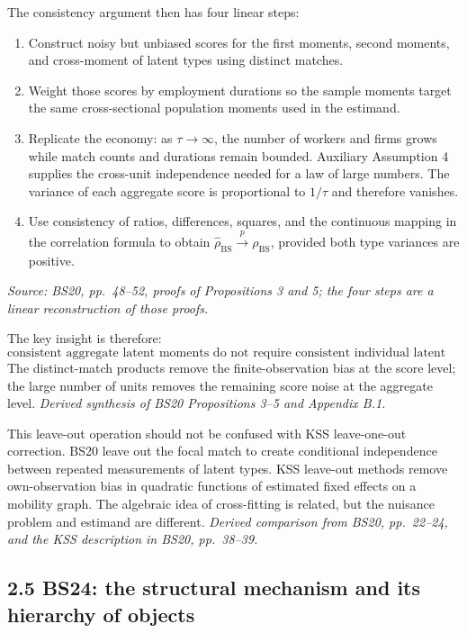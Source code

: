 \documentclass[11pt]{article}
\begin{document}
The consistency argument then has four linear steps:

\begin{enumerate}
\item Construct noisy but unbiased scores for the first moments, second
  moments, and cross-moment of latent types using distinct matches.
\item Weight those scores by employment durations so the sample moments target
  the same cross-sectional population moments used in the estimand.
\item Replicate the economy: as \(\tau\to\infty\), the number of workers and
  firms grows while match counts and durations remain bounded.  Auxiliary
  Assumption 4 supplies the cross-unit independence needed for a law of large
  numbers.  The variance of each aggregate score is proportional to
  \(1/\tau\) and therefore vanishes.
\item Use consistency of ratios, differences, squares, and the continuous
  mapping in the correlation formula to obtain
  \(\widehat\rho_{\mathrm{BS}}\overset{p}{\to}\rho_{\mathrm{BS}}\), provided
  both type variances are positive.
\end{enumerate}

\textit{Source: BS20, pp.\ 48--52, proofs of Propositions 3 and 5; the four
steps are a linear reconstruction of those proofs.}

The key insight is therefore:
\[
\boxed{
\text{consistent aggregate latent moments do not require consistent
individual latent types.}
}
\tag{T2.6}
\]
The distinct-match products remove the finite-observation bias at the score
level; the large number of units removes the remaining score noise at the
aggregate level.  \textit{Derived synthesis of BS20 Propositions 3--5 and
Appendix B.1.}

This leave-out operation should not be confused with KSS leave-one-out
correction.  BS20 leave out the focal match to create conditional independence
between repeated measurements of latent types.  KSS leave-out methods remove
own-observation bias in quadratic functions of estimated fixed effects on a
mobility graph.  The algebraic idea of cross-fitting is related, but the
nuisance problem and estimand are different.
\textit{Derived comparison from BS20, pp.\ 22--24, and the KSS description in
BS20, pp.\ 38--39.}

\subsection{2.5 BS24: the structural mechanism and its hierarchy of objects}
\end{document}
